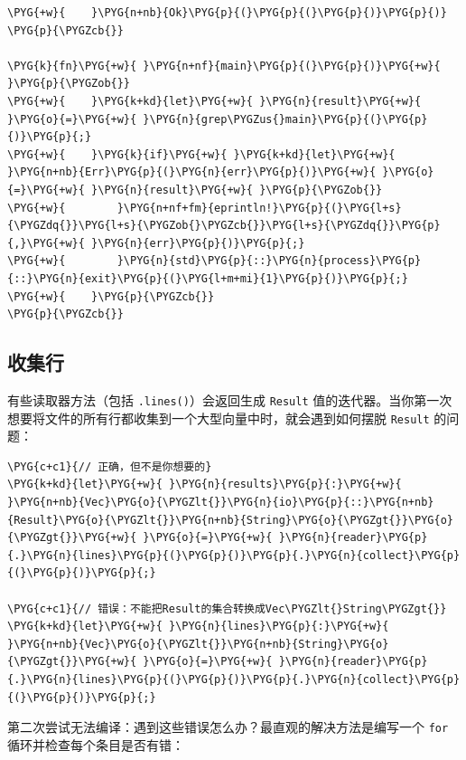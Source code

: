 \begin{Verbatim}[commandchars=\\\{\},breaklines=true,breakanywhere=true,fontsize=\codefont,xleftmargin=17bp]
\PYG{+w}{    }\PYG{n+nb}{Ok}\PYG{p}{(}\PYG{p}{(}\PYG{p}{)}\PYG{p}{)}
\PYG{p}{\PYGZcb{}}

\PYG{k}{fn}\PYG{+w}{ }\PYG{n+nf}{main}\PYG{p}{(}\PYG{p}{)}\PYG{+w}{ }\PYG{p}{\PYGZob{}}
\PYG{+w}{    }\PYG{k+kd}{let}\PYG{+w}{ }\PYG{n}{result}\PYG{+w}{ }\PYG{o}{=}\PYG{+w}{ }\PYG{n}{grep\PYGZus{}main}\PYG{p}{(}\PYG{p}{)}\PYG{p}{;}
\PYG{+w}{    }\PYG{k}{if}\PYG{+w}{ }\PYG{k+kd}{let}\PYG{+w}{ }\PYG{n+nb}{Err}\PYG{p}{(}\PYG{n}{err}\PYG{p}{)}\PYG{+w}{ }\PYG{o}{=}\PYG{+w}{ }\PYG{n}{result}\PYG{+w}{ }\PYG{p}{\PYGZob{}}
\PYG{+w}{        }\PYG{n+nf+fm}{eprintln!}\PYG{p}{(}\PYG{l+s}{\PYGZdq{}}\PYG{l+s}{\PYGZob{}\PYGZcb{}}\PYG{l+s}{\PYGZdq{}}\PYG{p}{,}\PYG{+w}{ }\PYG{n}{err}\PYG{p}{)}\PYG{p}{;}
\PYG{+w}{        }\PYG{n}{std}\PYG{p}{::}\PYG{n}{process}\PYG{p}{::}\PYG{n}{exit}\PYG{p}{(}\PYG{l+m+mi}{1}\PYG{p}{)}\PYG{p}{;}
\PYG{+w}{    }\PYG{p}{\PYGZcb{}}
\PYG{p}{\PYGZcb{}}
\end{Verbatim}

\subsection{收集行}

有些读取器方法（包括 \texttt{.lines()}）会返回生成 \texttt{Result} 值的迭代器。当你第一次想要将文件的所有行都收集到一个大型向量中时，就会遇到如何摆脱 \texttt{Result} 的问题：

\begin{Verbatim}[commandchars=\\\{\},breaklines=true,breakanywhere=true,fontsize=\codefont,xleftmargin=17bp]
\PYG{c+c1}{// 正确，但不是你想要的}
\PYG{k+kd}{let}\PYG{+w}{ }\PYG{n}{results}\PYG{p}{:}\PYG{+w}{ }\PYG{n+nb}{Vec}\PYG{o}{\PYGZlt{}}\PYG{n}{io}\PYG{p}{::}\PYG{n+nb}{Result}\PYG{o}{\PYGZlt{}}\PYG{n+nb}{String}\PYG{o}{\PYGZgt{}}\PYG{o}{\PYGZgt{}}\PYG{+w}{ }\PYG{o}{=}\PYG{+w}{ }\PYG{n}{reader}\PYG{p}{.}\PYG{n}{lines}\PYG{p}{(}\PYG{p}{)}\PYG{p}{.}\PYG{n}{collect}\PYG{p}{(}\PYG{p}{)}\PYG{p}{;}

\PYG{c+c1}{// 错误：不能把Result的集合转换成Vec\PYGZlt{}String\PYGZgt{}}
\PYG{k+kd}{let}\PYG{+w}{ }\PYG{n}{lines}\PYG{p}{:}\PYG{+w}{ }\PYG{n+nb}{Vec}\PYG{o}{\PYGZlt{}}\PYG{n+nb}{String}\PYG{o}{\PYGZgt{}}\PYG{+w}{ }\PYG{o}{=}\PYG{+w}{ }\PYG{n}{reader}\PYG{p}{.}\PYG{n}{lines}\PYG{p}{(}\PYG{p}{)}\PYG{p}{.}\PYG{n}{collect}\PYG{p}{(}\PYG{p}{)}\PYG{p}{;}
\end{Verbatim}

第二次尝试无法编译：遇到这些错误怎么办？最直观的解决方法是编写一个 \texttt{for} 循环并检查每个条目是否有错：

